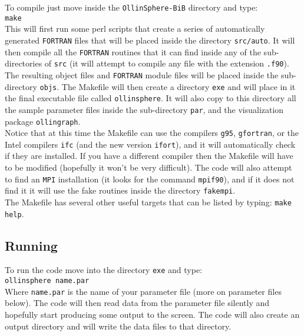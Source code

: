 \documentclass[12pt]{article}
\begin{document}
To compile just move inside the \texttt{OllinSphere-BiB} directory and type: \\

\texttt{make} \\

This will first run some perl scripts that create a series of
automatically generated \texttt{FORTRAN} files that will be placed
inside the directory \texttt{src/auto}.  It will then compile all the
\texttt{FORTRAN} routines that it can find inside any of the
sub-directories of \texttt{src} (it will attempt to compile any file
with the extension \texttt{.f90}). \\

The resulting object files and \texttt{FORTRAN} module files will be
placed inside the sub-directory \texttt{objs}. The Makefile will then
create a directory \texttt{exe} and will place in it the final
executable file called \texttt{ollinsphere}.  It will also copy to
this directory all the sample parameter files inside the sub-directory
\texttt{par}, and the visualization package \texttt{ollingraph}. \\

Notice that at this time the Makefile can use the compilers
\texttt{g95}, \texttt{gfortran}, or the Intel compilers \texttt{ifc}
(and the new version \texttt{ifort}), and it will automatically check
if they are installed. If you have a different compiler then the
Makefile will have to be modified (hopefully it won't be very
difficult). The code will also attempt to find an \texttt{MPI}
installation (it looks for the command \texttt{mpif90}), and if it
does not find it it will use the fake routines inside the directory
\texttt{fakempi}. \\

The Makefile has several other useful targets that can be listed by
typing: \texttt{make help}. \\


\subsection{Running}
\label{sec:running}

To run the code move into the directory \texttt{exe} and type: \\

\texttt{ollinsphere name.par} \\

Where \texttt{name.par} is the name of your parameter file (more on
parameter files below).  The code will then read data from the
parameter file silently and hopefully start producing some output to
the screen. The code will also create an output directory and will
write the data files to that directory. \\
\end{document}
